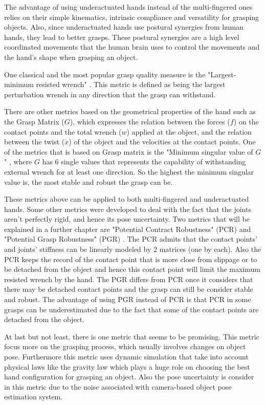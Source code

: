 The advantage of using underactuated hands instead of the multi-fingered ones relies on their simple kinematics, intrinsic compliance and versatility for grasping objects.
Also, since underactuated hands use postural synergies from human hands, they lead to better grasps. These postural synergies are a high level coordinated movements that the human brain uses to control the movements and the hand's shape when grasping an object.
\par
One classical and the most popular grasp quality measure is the "Largest-minimum resisted wrench" \cite{ferrari1992planning}. This metric is defined as being the largest perturbation wrench in any direction that the grasp can withstand. 
\par
There are other metrics based on the geometrical properties of the hand such as the Grasp Matrix ($G$), which expresses the relation between the forces ($f$) on the contact points and the total wrench ($w$) applied at the object, and the relation between the twist ($\Dot{x}$) of the object and the velocities at the contact points. One of the metrics that is based on Grasp matrix is the "Minimum singular value of $G$" \cite{roa2015grasp}, where $G$ has 6 single values that represents the capability of withstanding external wrench for at least one direction. So the highest the minimum singular value is, the most stable and robust the grasp can be.
\par
These metrics above can be applied to both multi-fingered and underactuated hands. Some other metrics were developed to deal with the fact that the joints aren't perfectly rigid, and hence its pose uncertainty. Two metrics that will be explained in a further chapter are "Potential Contract Robustness" (PCR) and "Potential Grasp Robustness" (PGR) \cite{pozzi2016grasp}. The PCR admits that the contact points' and joints' stiffness can be linearly modeled by 2 matrices (one by each). Also the PCR keeps the record of the contact point that is more close from slippage or to be detached from the object and hence this contact point will limit the maximum resisted wrench by the hand.
The PGR differs from PCR once it considers that there may be detached contact points and the grasp can still be consider stable and robust. The advantage of using PGR instead of PCR is that PCR in some grasps can be underestimated due to the fact that some of the contact points are detached from the object.
\par
At last but not least, there is one metric that seems to be promising. This metric \cite{kim2013physically} focus more on the grasping process, which usually involves changes on object pose. Furthermore this metric uses dynamic simulation that take into account physical laws like the gravity law which plays a huge role on choosing the best hand configuration for grasping an object. Also the pose uncertainty is consider in this metric due to the noise associated with camera-based object pose estimation system. 
